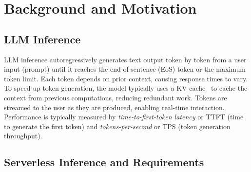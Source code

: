 \section{Background and Motivation}
\label{sec:background}

\subsection{LLM Inference}
\label{sec:background-llm-inference}
LLM inference autoregressively generates text output token by token from a user input (prompt) until it reaches the end-of-sentence (EoS) token or the maximum token limit. Each token depends on prior context, causing response times to vary. To speed up token generation, the model typically uses a KV cache~\cite{vllm} to cache the context from previous computations, reducing redundant work. Tokens are streamed to the user as they are produced, enabling real-time interaction. Performance is typically measured by \emph{time-to-first-token latency} or TTFT (time to generate the first token) and \emph{tokens-per-second} or TPS (token generation throughput).  



\subsection{Serverless Inference and Requirements}
\label{sec:background-serverless}

